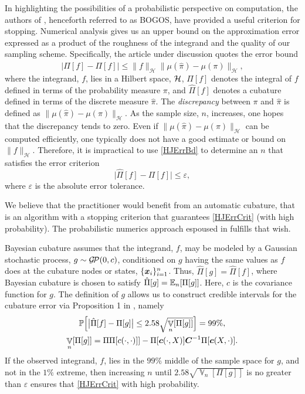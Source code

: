 \documentclass[sts]{imsart}
\numberwithin{equation}{section}
\theoremstyle{plain}
\newcommand{\calH}{\mathcal{H}}
\newcommand{\vC}{\boldsymbol{C}}
\newcommand{\calGP}{\cg\!\cp}
\DeclareMathOperator{\Var}{\mathbb{V}}
\newcommand{\BOGOS}{BOGOS\xspace}
\begin{document}
In highlighting the possibilities of a probabilistic perspective on computation, the authors of \cite{BriEtal18a}, henceforth referred to as \BOGOS, have provided a useful criterion for stopping.  Numerical analysis gives us an upper bound on the approximation error expressed as a product of the roughness of the integrand and the quality of our sampling scheme.  Specifically, the article under discussion \cite[(5)]{BriEtal18a} quotes the error bound
\begin{equation} \label{HJErrBd}
    \bigl \lvert \hat{\Pi}[f] - \Pi[f] \rvert \le \lVert f \rVert_{\calH} \lVert \mu(\hat{\pi}) - \mu(\pi) \rVert_{\calH},
\end{equation}
where the integrand, $f$, lies in a Hilbert space, $\mathcal{H}$, $\Pi[f]$ denotes the integral of $f$ defined in terms of the probability measure $\pi$, and $\hat{\Pi}[f]$ denotes a cubature defined in terms of the discrete measure $\hat{\pi}$. The \emph{discrepancy} between $\pi$ and $\hat{\pi}$ is defined as $\lVert \mu(\hat{\pi}) - \mu(\pi) \rVert_{\calH}$. As the sample size, $n$, increases, one hopes that the discrepancy tends to zero.  Even if $\lVert \mu(\hat{\pi}) - \mu(\pi) \rVert_{\calH}$ can be computed efficiently, one typically does not have a good estimate or bound on $\lVert f \rVert_{\calH}$.  Therefore, it is impractical to use  \eqref{HJErrBd} to determine an $n$ that satisfies the error criterion
\begin{equation} \label{HJErrCrit}
    \bigl \lvert \hat{\Pi}[f] - \Pi[f] \bigr \rvert \le \varepsilon,
\end{equation}
where $\varepsilon$ is the absolute error tolerance.  

We believe that the practitioner would benefit from an automatic cubature, that is an algorithm with a stopping criterion that guarantees \eqref{HJErrCrit} (with high probability).  The probabilistic numerics approach espoused in \cite{BriEtal18a} fulfills that wish.  

Bayesian cubature assumes that the integrand, $f$, may be modeled by a Gaussian stochastic process, $g \sim \calGP(0,c)$, conditioned on $g$ having the same values as $f$ does at the cubature nodes or states, $\{\boldsymbol{x}_i\}_{i=1}^n$.  Thus, $\hat{\Pi}[g] = \hat{\Pi}[f]$, where Bayesian cubature is chosen to satisfy $\hat{\Pi}[g] = \operatorname{\mathbb{E}}_n[\Pi[g]]$.  Here, $c$ is the covariance function for $g$.  The definition of $g$ allows us to construct credible intervals for the cubature error via Proposition 1 in  \cite{BriEtal18a}, namely
\begin{gather}
\label{credInt}
    \Prob\Bigl[\bigl \lvert \hat{\Pi}[f] - \Pi[g] \bigr \rvert \le 2.58 \sqrt{\Var_n[\Pi[g]]}  \Bigr] = 99\%, \\
    \label{Vnform}
    \Var_n[\Pi[g]] = \Pi\Pi[c(\cdot,\cdot)]] - \Pi[\vc(\cdot,X)] \vC^{-1} \Pi[\vc(X,\cdot)].
\end{gather}
If the observed integrand, $f$, lies in the $99\%$ middle of the sample space for $g$, and not in the $1\%$ extreme, then increasing $n$ until $2.58 \sqrt{\Var_n[\Pi[g]]}$ is no greater than $\varepsilon$ ensures that  \eqref{HJErrCrit} with high probability.
\end{document}
